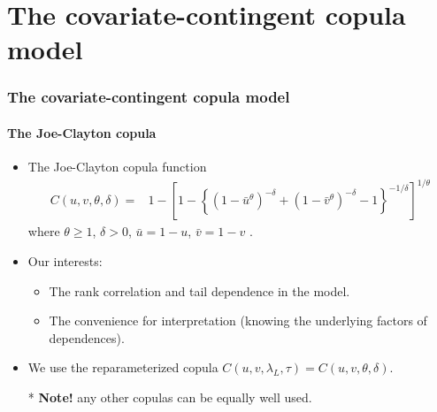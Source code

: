 \documentclass{beamer}
\begin{document}
\section{The covariate-contingent copula model}
\begin{frame}
  \frametitle{The covariate-contingent copula model}
  \framesubtitle{The Joe-Clayton copula}
  \begin{itemize}
  \item The Joe-Clayton copula function
    \[
    \begin{split}
      C(u,v,\theta,\delta)=&1-\left[1-\left\{\left(1-\bar u ^{\theta }\right)^{-\delta
          }+\left(1-\bar v ^{\theta }\right)^{-\delta }-1\right\}^{-1/\delta
        }\right]^{1/\theta }
    \end{split}
    \]
    where $\theta \geq 1$, $\delta > 0$, $\bar u = 1-u$, $\bar v = 1-v$ .


  \item Our interests:
    \begin{itemize}
    \item The rank correlation and tail dependence in the model.
    \item The convenience for interpretation (knowing the underlying factors of
      dependences).
    \end{itemize}

  \item We use the reparameterized copula    $C(u,v,\lambda_L,
    \tau)=C(u,v,\theta,\delta)$.
  \item [*] \textbf{Note!} any other copulas can be equally well used.
  \end{itemize}

\end{frame}

\end{document}
